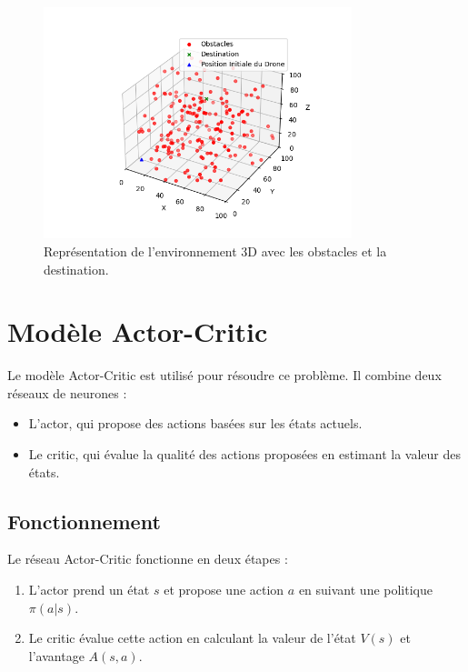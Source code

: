 \documentclass[a4paper, 12pt]{article}
\begin{document}
\begin{figure}[h]
    \centering
    \includegraphics[width=0.8\textwidth]{Figure_1.png}
    \caption{Représentation de l'environnement 3D avec les obstacles et la destination.}
    \label{fig:environment}
\end{figure}

\section{Modèle Actor-Critic}
Le modèle Actor-Critic est utilisé pour résoudre ce problème. Il combine deux réseaux de neurones :
\begin{itemize}
    \item L'actor, qui propose des actions basées sur les états actuels.
    \item Le critic, qui évalue la qualité des actions proposées en estimant la valeur des états.
\end{itemize}

\subsection{Fonctionnement}
Le réseau Actor-Critic fonctionne en deux étapes :
\begin{enumerate}
    \item L'actor prend un état $s$ et propose une action $a$ en suivant une politique $\pi(a|s)$.
    \item Le critic évalue cette action en calculant la valeur de l'état $V(s)$ et l'avantage $A(s, a)$.
\end{enumerate}
\end{document}

